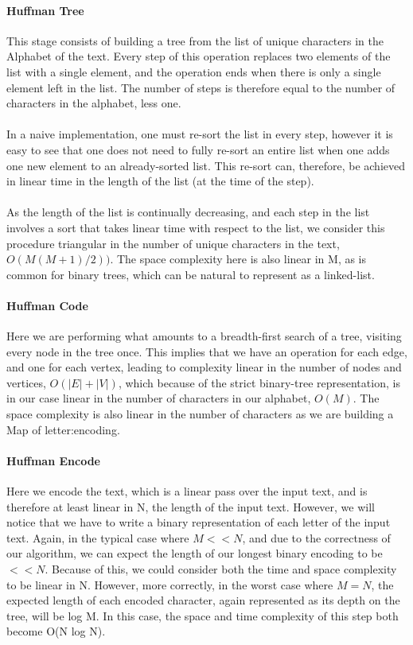 \documentclass[paper=a4, fontsize=10pt]{article} %
\numberwithin{equation}{section} %
\numberwithin{figure}{section} %
\numberwithin{table}{section} %
\begin{document}
\paragraph{Huffman Tree}
This stage consists of building a tree from the list of unique characters in the Alphabet of the text. Every step of this operation replaces two elements of the list with a single element, and the operation ends when there is only a single element left in the list. The number of steps is therefore equal to the number of characters in the alphabet, less one.
\\
\\
In a naive implementation, one must re-sort the list in every step, however it is easy to see that one does not need to fully re-sort an entire list when one adds one new element to an already-sorted list. This re-sort can, therefore, be achieved in linear time in the length of the list (at the time of the step).
\\
\\
As the length of the list is continually decreasing, and each step in the list involves a sort that takes linear time with respect to the list, we consider this procedure triangular in the number of unique characters in the text, $O(M (M+1)/2))$. The space complexity here is also linear in M, as is common for binary trees, which can be natural to represent as a linked-list.

\paragraph{Huffman Code}
Here we are performing what amounts to a breadth-first search of a tree, visiting every node in the tree once. This implies that we have an operation for each edge, and one for each vertex, leading to complexity linear in the number of nodes and vertices, $O(|E| + |V|)$, which because of the strict binary-tree representation, is in our case linear in the number of characters in our alphabet, $O(M)$. The space complexity is also linear in the number of characters as we are building a Map of letter:encoding.

\paragraph{Huffman Encode}
Here we encode the text, which is a linear pass over the input text, and is therefore at least linear in N, the length of the input text. However, we will notice that we have to write a binary representation of each letter of the input text. Again, in the typical case where $M << N$, and due to the correctness of our algorithm, we can expect the length of our longest binary encoding to be $<< N$. Because of this, we could consider both the time and space complexity to be linear in N. However, more correctly, in the worst case where $M = N$, the expected length of each encoded character, again represented as its depth on the tree, will be log M. In this case, the space and time complexity of this step both become O(N log N).
\end{document}
